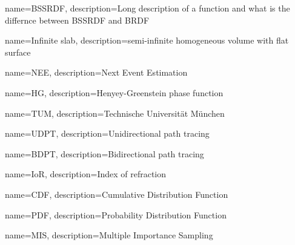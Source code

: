 {
    name={BSSRDF},
    description={Long description of a function and what is the differnce
    between BSSRDF and BRDF}
}

{
    name={Infinite slab},
    description={semi-infinite homogeneous volume with flat surface}
}

{
    name={NEE},
    description={Next Event Estimation}
}

{
    name={HG},
    description={Henyey-Greenstein phase function}
}

{
    name={TUM},
    description={Technische Universität München}
}

{
    name={UDPT},
    description={Unidirectional path tracing}
}

{
    name={BDPT},
    description={Bidirectional path tracing}
}

{
    name={IoR},
    description={Index of refraction}
}

{
    name={CDF},
    description={Cumulative Distribution Function}
}

{
    name={PDF},
    description={Probability Distribution Function}
}

{
    name={MIS},
    description={Multiple Importance Sampling}
}
